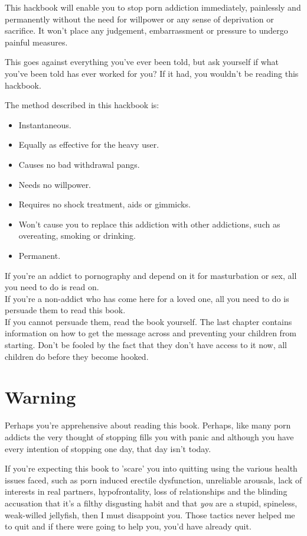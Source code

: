 \documentclass[easypeasy.tex]{subfiles}
\begin{document}
This hackbook will enable you to stop porn addiction immediately, painlessly and permanently without the need for willpower or any sense of deprivation or sacrifice. It won't place any judgement, embarrassment or pressure to undergo painful measures.

This goes against everything you've ever been told, but ask yourself if what you've been told has ever worked for you? If it had, you wouldn't be reading this hackbook.

The method described in this hackbook is:
\begin{itemize}
\item Instantaneous.
\item Equally as effective for the heavy user.
\item Causes no bad withdrawal pangs.
\item Needs no willpower.
\item Requires no shock treatment, aids or gimmicks.
\item Won't cause you to replace this addiction with other addictions, such as overeating, smoking or drinking.
\item Permanent.
\end{itemize}

If you're an addict to pornography and depend on it for masturbation or sex, all you need to do is read on.\\
If you're a non-addict who has come here for a loved one, all you need to do is persuade them to read this book.\\
If you cannot persuade them, read the book yourself. The last chapter contains information on how to get the message across and preventing your children from starting. Don't be fooled by the fact that they don't have access to it now, all children do before they become hooked.

\section{Warning}
Perhaps you're apprehensive about reading this book. Perhaps, like many porn addicts the very thought of stopping fills you with panic and although you have every intention of stopping one day, that day isn't today.

If you're expecting this book to 'scare' you into quitting using the various health issues faced, such as porn induced erectile dysfunction, unreliable arousals, lack of interests in real partners, hypofrontality, loss of relationships and the blinding accusation that it's a filthy disgusting habit and that \textit{you} are a stupid, spineless, weak-willed jellyfish, then I must disappoint you. Those tactics never helped me to quit and if there were going to help you, you'd have already quit.
\end{document}
